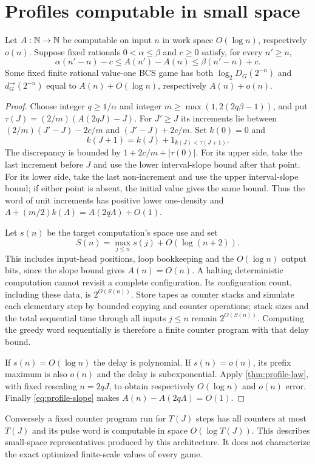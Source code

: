 \section{Profiles computable in small space}\label{sec:profile-space}
\begin{corollary}\label{cor:profile-space}
Let $A:\mathbb N\to\mathbb N$ be computable on input $n$ in work space $O(\log n)$, respectively $o(n)$. Suppose fixed rationals $0<\alpha\le\beta$ and $c\ge0$ satisfy, for every $n'\ge n$,
\begin{equation}\label{eq:profile-slope}
 \alpha(n'-n)-c\le A(n')-A(n)\le\beta(n'-n)+c.
\end{equation}
Some fixed finite rational value-one BCS game has both $\log_2D_G(2^{-n})$ and $d_G^\to(2^{-n})$ equal to $A(n)+O(\log n)$, respectively $A(n)+o(n)$.
\end{corollary}
\begin{proof}
Choose integer $q\ge1/\alpha$ and integer $m\ge\max(1,2(2q\beta-1))$, and put $\tau(J)=(2/m)(A(2qJ)-J)$. For $J'\ge J$ its increments lie between $(2/m)(J'-J)-2c/m$ and $(J'-J)+2c/m$. Set $k(0)=0$ and
\[
 k(J+1)=k(J)+1_{k(J)<\tau(J+1)}.
\]
The discrepancy is bounded by $1+2c/m+|\tau(0)|$. For its upper side, take the last increment before $J$ and use the lower interval-slope bound after that point. For its lower side, take the last non-increment and use the upper interval-slope bound; if either point is absent, the initial value gives the same bound. Thus the word of unit increments has positive lower one-density and $\Lambda+(m/2)k(\Lambda)=A(2q\Lambda)+O(1)$.

Let $s(n)$ be the target computation's space use and set
\begin{equation}\label{eq:profile-space-envelope}
 S(n)=\max_{j\le n}s(j)+O(\log(n+2)).
\end{equation}
This includes input-head positions, loop bookkeeping and the $O(\log n)$ output bits, since the slope bound gives $A(n)=O(n)$. A halting deterministic computation cannot revisit a complete configuration. Its configuration count, including these data, is $2^{O(S(n))}$. Store tapes as counter stacks and simulate each elementary step by bounded copying and counter operations; stack sizes and the total sequential time through all inputs $j\le n$ remain $2^{O(S(n))}$. Computing the greedy word sequentially is therefore a finite counter program with that delay bound.

If $s(n)=O(\log n)$ the delay is polynomial. If $s(n)=o(n)$, its prefix maximum is also $o(n)$ and the delay is subexponential. Apply \cref{thm:profile-law}, with fixed rescaling $n=2qJ$, to obtain respectively $O(\log n)$ and $o(n)$ error. Finally \eqref{eq:profile-slope} makes $A(n)-A(2q\Lambda)=O(1)$.
\end{proof}
Conversely a fixed counter program run for $T(J)$ steps has all counters at most $T(J)$ and its pulse word is computable in space $O(\log T(J))$. This describes small-space representatives produced by this architecture. It does not characterize the exact optimized finite-scale values of every game.
